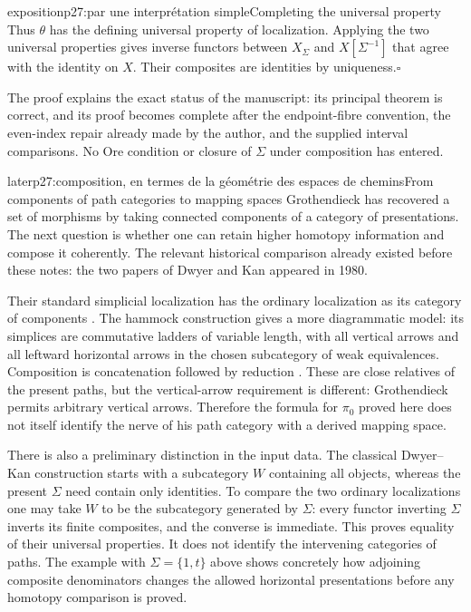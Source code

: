 \begin{dcomment}{exposition}{p27:par une interprétation simple}{Completing the universal property}
Thus $\theta$ has the defining universal property of localization. Applying the two universal properties gives inverse functors between $X_\Sigma$ and $X[\Sigma^{-1}]$ that agree with the identity on $X$. Their composites are identities by uniqueness.\hfill$\square$

The proof explains the exact status of the manuscript: its principal theorem is correct, and its proof becomes complete after the endpoint-fibre convention, the even-index repair already made by the author, and the supplied interval comparisons. No Ore condition or closure of $\Sigma$ under composition has entered.
\end{dcomment}

\begin{dcomment}{later}{p27:composition, en termes de la géométrie des espaces de chemins}{From components of path categories to mapping spaces}
Grothendieck has recovered a set of morphisms by taking connected components of a category of presentations. The next question is whether one can retain higher homotopy information and compose it coherently. The relevant historical comparison already existed before these notes: the two papers of Dwyer and Kan appeared in 1980.

Their standard simplicial localization has the ordinary localization as its category of components \citep[\S4.2]{DwyerKan1980Simplicial}. The hammock construction gives a more diagrammatic model: its simplices are commutative ladders of variable length, with all vertical arrows and all leftward horizontal arrows in the chosen subcategory of weak equivalences. Composition is concatenation followed by reduction \citep[Definition~2.1 and Proposition~3.1]{DwyerKan1980Calculating}. These are close relatives of the present paths, but the vertical-arrow requirement is different: Grothendieck permits arbitrary vertical arrows. Therefore the formula for $\pi_0$ proved here does not itself identify the nerve of his path category with a derived mapping space.

There is also a preliminary distinction in the input data. The classical Dwyer--Kan construction starts with a subcategory $W$ containing all objects, whereas the present $\Sigma$ need contain only identities. To compare the two ordinary localizations one may take $W$ to be the subcategory generated by $\Sigma$: every functor inverting $\Sigma$ inverts its finite composites, and the converse is immediate. This proves equality of their universal properties. It does not identify the intervening categories of paths. The example with $\Sigma=\{1,t\}$ above shows concretely how adjoining composite denominators changes the allowed horizontal presentations before any homotopy comparison is proved.


\end{dcomment}

